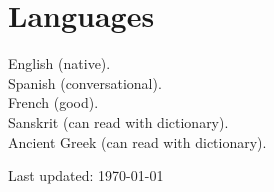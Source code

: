 \documentclass[11pt, letterpaper]{article} %
\newcommand{\years}[1]{\marginnote{\scriptsize #1}} %
\begin{document}


\section*{Languages}
\years{}English (native).\\
\years{}Spanish (conversational).\\
\years{}French (good). \\
\years{}Sanskrit (can read with dictionary).\\
\years{}Ancient Greek (can read with dictionary).






\vfill{} %


\begin{center}
{\scriptsize Last updated: \today }
\end{center}

\end{document}
